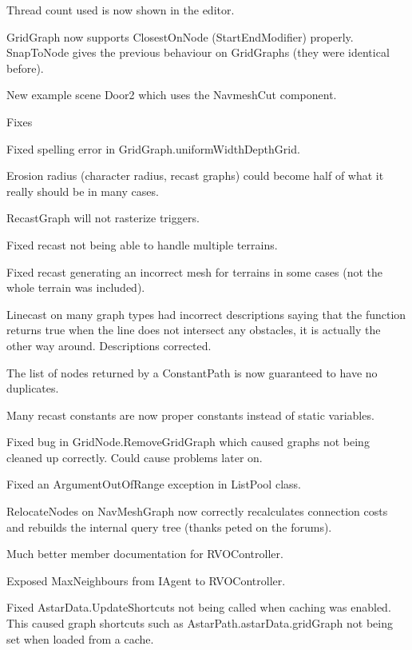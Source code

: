 \begin{DoxyItemize}
\begin{DoxyItemize}
\begin{DoxyItemize}
\item Thread count used is now shown in the editor.
\item Grid\+Graph now supports Closest\+On\+Node (Start\+End\+Modifier) properly. Snap\+To\+Node gives the previous behaviour on Grid\+Graphs (they were identical before).
\item New example scene Door2 which uses the Navmesh\+Cut component.
\end{DoxyItemize}
\item Fixes
\begin{DoxyItemize}
\item Fixed spelling error in Grid\+Graph.\+uniform\+Width\+Depth\+Grid.
\item Erosion radius (character radius, recast graphs) could become half of what it really should be in many cases.
\item Recast\+Graph will not rasterize triggers.
\item Fixed recast not being able to handle multiple terrains.
\item Fixed recast generating an incorrect mesh for terrains in some cases (not the whole terrain was included).
\item Linecast on many graph types had incorrect descriptions saying that the function returns true when the line does not intersect any obstacles, it is actually the other way around. Descriptions corrected.
\item The list of nodes returned by a Constant\+Path is now guaranteed to have no duplicates.
\item Many recast constants are now proper constants instead of static variables.
\item Fixed bug in Grid\+Node.\+Remove\+Grid\+Graph which caused graphs not being cleaned up correctly. Could cause problems later on.
\item Fixed an Argument\+Out\+Of\+Range exception in List\+Pool class.
\item Relocate\+Nodes on Nav\+Mesh\+Graph now correctly recalculates connection costs and rebuilds the internal query tree (thanks peted on the forums).
\item Much better member documentation for R\+V\+O\+Controller.
\item Exposed Max\+Neighbours from I\+Agent to R\+V\+O\+Controller.
\item Fixed Astar\+Data.\+Update\+Shortcuts not being called when caching was enabled. This caused graph shortcuts such as Astar\+Path.\+astar\+Data.\+grid\+Graph not being set when loaded from a cache.

\end{DoxyItemize}
\end{DoxyItemize}
\end{DoxyItemize}
